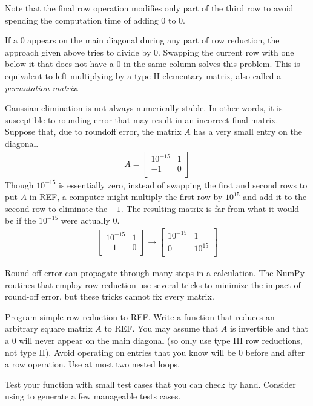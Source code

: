 Note that the final row operation modifies only part of the third row to avoid spending the computation time of adding $0$ to $0$.

If a $0$ appears on the main diagonal during any part of row reduction, the approach given above tries to divide by $0$.
Swapping the current row with one below it that does not have a $0$ in the same column solves this problem.
This is equivalent to left-multiplying by a type II elementary matrix, also called a \emph{permutation matrix}.

\begin{warn} %
Gaussian elimination is not always numerically stable.
In other words, it is susceptible to rounding error that may result in an incorrect final matrix.
Suppose that, due to roundoff error, the matrix $A$ has a very small entry on the diagonal.
\begin{align*}
A = \left[\begin{array}{cc}
10^{-15} & 1 \\
-1 & 0 \\
\end{array}\right]
\end{align*}
Though $10^{-15}$ is essentially zero, instead of swapping the first and second rows to put $A$ in REF, a computer might multiply the first row by $10^{15}$ and add it to the second row to eliminate the $-1$.
The resulting matrix is far from what it would be if the $10^{-15}$ were actually $0$.
\begin{align*}
\left[\begin{array}{cc}
10^{-15} & 1 \\
-1 & 0 \\
\end{array}\right]
\longrightarrow
\left[\begin{array}{cc}
10^{-15} & 1 \\
0 & 10^{15} \\
\end{array}\right]
\end{align*}

Round-off error can propagate through many steps in a calculation. %
The NumPy routines that employ row reduction use several tricks to minimize the impact of round-off error, but these tricks cannot fix every matrix.
\end{warn}

\begin{problem}{Program simple row reduction to REF.}
Write a function that reduces an arbitrary square matrix $A$ to REF.
You may assume that $A$ is invertible and that a $0$ will never appear on the main diagonal (so only use type III row reductions, not type II).
Avoid operating on entries that you know will be $0$ before and after a row operation.
Use at most two nested loops.

Test your function with small test cases that you can check by hand.
Consider using  to generate a few manageable tests cases.
\label{prob:ref-row-reduction}
\end{problem}

